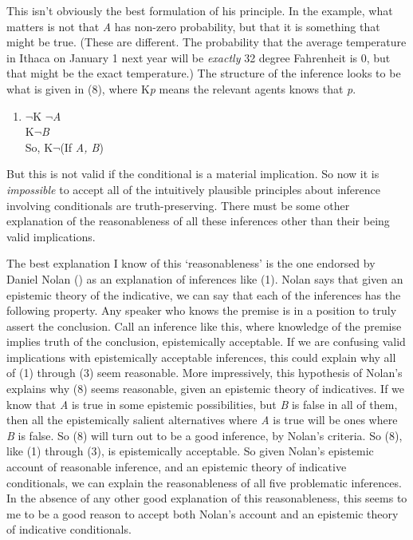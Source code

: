 \documentclass[
  11pt,
  letterpaper,
  DIV=11,
  numbers=noendperiod,
  oneside]{scrartcl}
\providecommand{\tightlist}{%
  \setlength{\itemsep}{0pt}\setlength{\parskip}{0pt}}\usepackage{longtable,booktabs,array}
\begin{document}
This isn't obviously the best formulation of his principle. In the
example, what matters is not that \emph{A} has non-zero probability, but
that it is something that might be true. (These are different. The
probability that the average temperature in Ithaca on January 1 next
year will be \emph{exactly} 32 degree Fahrenheit is 0, but that might be
the exact temperature.) The structure of the inference looks to be what
is given in (8), where K\emph{p} means the relevant agents knows that
\emph{p}.

\begin{enumerate}
\def\labelenumi{\arabic{enumi}.}
\setcounter{enumi}{7}
\tightlist
\item
  \(\neg\)K \(\neg\)\emph{A}\\
  K\(\neg\)\emph{B}\\
  So, K\(\neg\)(If \emph{A, B})
\end{enumerate}

But this is not valid if the conditional is a material implication. So
now it is \emph{impossible} to accept all of the intuitively plausible
principles about inference involving conditionals are truth-preserving.
There must be some other explanation of the reasonableness of all these
inferences other than their being valid implications.

The best explanation I know of this `reasonableness' is the one endorsed
by Daniel Nolan () as an explanation of
inferences like (1). Nolan says that given an epistemic theory of the
indicative, we can say that each of the inferences has the following
property. Any speaker who knows the premise is in a position to truly
assert the conclusion. Call an inference like this, where knowledge of
the premise implies truth of the conclusion, epistemically acceptable.
If we are confusing valid implications with epistemically acceptable
inferences, this could explain why all of (1) through (3) seem
reasonable. More impressively, this hypothesis of Nolan's explains why
(8) seems reasonable, given an epistemic theory of indicatives. If we
know that \emph{A} is true in some epistemic possibilities, but \emph{B}
is false in all of them, then all the epistemically salient alternatives
where \emph{A} is true will be ones where \emph{B} is false. So (8) will
turn out to be a good inference, by Nolan's criteria. So (8), like (1)
through (3), is epistemically acceptable. So given Nolan's epistemic
account of reasonable inference, and an epistemic theory of indicative
conditionals, we can explain the reasonableness of all five problematic
inferences. In the absence of any other good explanation of this
reasonableness, this seems to me to be a good reason to accept both
Nolan's account and an epistemic theory of indicative conditionals.
\end{document}

